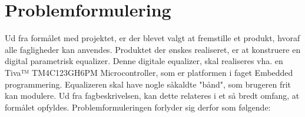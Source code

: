 \section{Problemformulering}
%
%


%
Ud fra formålet med projektet, er der blevet valgt at fremstille et produkt, hvoraf alle fagligheder kan anvendes. Produktet der ønskes realiseret, er at konstruere en digital parametrisk equalizer. Denne digitale equalizer, skal realiseres vha. en Tiva™ TM4C123GH6PM Microcontroller, som er platformen i faget Embedded programmering. Equalizeren skal have nogle såkaldte "bånd", som brugeren frit kan modulere. Ud fra fagbeskrivelsen, kan dette relateres i et så bredt omfang, at formålet opfyldes. Problemformuleringen forlyder sig derfor som følgende: \\

